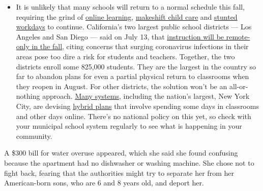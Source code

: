\begin{itemize}
  \begin{itemize}
  \tightlist
  \item
    It is unlikely that many schools will return to a normal schedule
    this fall, requiring the grind of
    \href{https://www.nytimes3xbfgragh.onion/2020/06/05/us/coronavirus-education-lost-learning.html?action=click\&pgtype=Article\&state=default\&region=MAIN_CONTENT_3\&context=storylines_faq}{online
    learning},
    \href{https://www.nytimes3xbfgragh.onion/2020/05/29/us/coronavirus-child-care-centers.html?action=click\&pgtype=Article\&state=default\&region=MAIN_CONTENT_3\&context=storylines_faq}{makeshift
    child care} and
    \href{https://www.nytimes3xbfgragh.onion/2020/06/03/business/economy/coronavirus-working-women.html?action=click\&pgtype=Article\&state=default\&region=MAIN_CONTENT_3\&context=storylines_faq}{stunted
    workdays} to continue. California's two largest public school
    districts --- Los Angeles and San Diego --- said on July 13, that
    \href{https://www.nytimes3xbfgragh.onion/2020/07/13/us/lausd-san-diego-school-reopening.html?action=click\&pgtype=Article\&state=default\&region=MAIN_CONTENT_3\&context=storylines_faq}{instruction
    will be remote-only in the fall}, citing concerns that surging
    coronavirus infections in their areas pose too dire a risk for
    students and teachers. Together, the two districts enroll some
    825,000 students. They are the largest in the country so far to
    abandon plans for even a partial physical return to classrooms when
    they reopen in August. For other districts, the solution won't be an
    all-or-nothing approach.
    \href{https://bioethics.jhu.edu/research-and-outreach/projects/eschool-initiative/school-policy-tracker/}{Many
    systems}, including the nation's largest, New York City, are
    devising
    \href{https://www.nytimes3xbfgragh.onion/2020/06/26/us/coronavirus-schools-reopen-fall.html?action=click\&pgtype=Article\&state=default\&region=MAIN_CONTENT_3\&context=storylines_faq}{hybrid
    plans} that involve spending some days in classrooms and other days
    online. There's no national policy on this yet, so check with your
    municipal school system regularly to see what is happening in your
    community.
  \end{itemize}
\end{itemize}

A \$300 bill for water overuse appeared, which she said she found
confusing because the apartment had no dishwasher or washing machine.
She chose not to fight back, fearing that the authorities might try to
separate her from her American-born sons, who are 6 and 8 years old, and
deport her.

